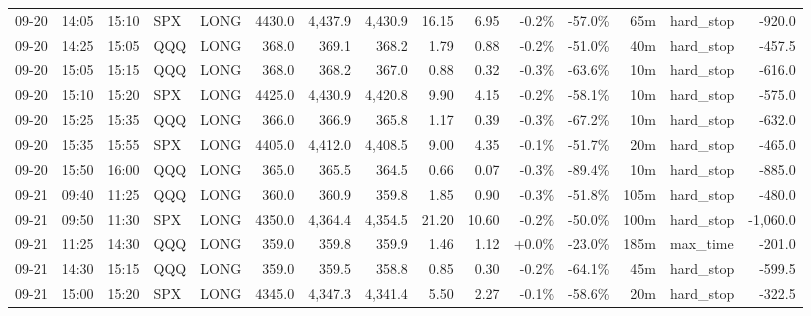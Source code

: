 \documentclass[11pt,a4paper,twoside]{article}
\begin{document}
\begin{landscape}
\begin{center}
\begin{longtable}{>{\color{txtmain}}l l l l l r r r r r r r r >{\color{txtmain}}l r}
09-20 & 14:05 & 15:10 & SPX & LONG & 4430.0 & 4,437.9 & 4,430.9 & 16.15 & 6.95 & \textcolor{lossred}{-0.2\%} & \textcolor{lossred}{-57.0\%} & 65m & hard\_stop & \textcolor{lossred}{-920.0} \\
09-20 & 14:25 & 15:05 & QQQ & LONG & 368.0 & 369.1 & 368.2 & 1.79 & 0.88 & \textcolor{lossred}{-0.2\%} & \textcolor{lossred}{-51.0\%} & 40m & hard\_stop & \textcolor{lossred}{-457.5} \\
09-20 & 15:05 & 15:15 & QQQ & LONG & 368.0 & 368.2 & 367.0 & 0.88 & 0.32 & \textcolor{lossred}{-0.3\%} & \textcolor{lossred}{-63.6\%} & 10m & hard\_stop & \textcolor{lossred}{-616.0} \\
09-20 & 15:10 & 15:20 & SPX & LONG & 4425.0 & 4,430.9 & 4,420.8 & 9.90 & 4.15 & \textcolor{lossred}{-0.2\%} & \textcolor{lossred}{-58.1\%} & 10m & hard\_stop & \textcolor{lossred}{-575.0} \\
09-20 & 15:25 & 15:35 & QQQ & LONG & 366.0 & 366.9 & 365.8 & 1.17 & 0.39 & \textcolor{lossred}{-0.3\%} & \textcolor{lossred}{-67.2\%} & 10m & hard\_stop & \textcolor{lossred}{-632.0} \\
09-20 & 15:35 & 15:55 & SPX & LONG & 4405.0 & 4,412.0 & 4,408.5 & 9.00 & 4.35 & \textcolor{lossred}{-0.1\%} & \textcolor{lossred}{-51.7\%} & 20m & hard\_stop & \textcolor{lossred}{-465.0} \\
09-20 & 15:50 & 16:00 & QQQ & LONG & 365.0 & 365.5 & 364.5 & 0.66 & 0.07 & \textcolor{lossred}{-0.3\%} & \textcolor{lossred}{-89.4\%} & 10m & hard\_stop & \textcolor{lossred}{-885.0} \\
09-21 & 09:40 & 11:25 & QQQ & LONG & 360.0 & 360.9 & 359.8 & 1.85 & 0.90 & \textcolor{lossred}{-0.3\%} & \textcolor{lossred}{-51.8\%} & 105m & hard\_stop & \textcolor{lossred}{-480.0} \\
09-21 & 09:50 & 11:30 & SPX & LONG & 4350.0 & 4,364.4 & 4,354.5 & 21.20 & 10.60 & \textcolor{lossred}{-0.2\%} & \textcolor{lossred}{-50.0\%} & 100m & hard\_stop & \textcolor{lossred}{-1,060.0} \\
09-21 & 11:25 & 14:30 & QQQ & LONG & 359.0 & 359.8 & 359.9 & 1.46 & 1.12 & \textcolor{wingreen}{+0.0\%} & \textcolor{lossred}{-23.0\%} & 185m & max\_time & \textcolor{lossred}{-201.0} \\
09-21 & 14:30 & 15:15 & QQQ & LONG & 359.0 & 359.5 & 358.8 & 0.85 & 0.30 & \textcolor{lossred}{-0.2\%} & \textcolor{lossred}{-64.1\%} & 45m & hard\_stop & \textcolor{lossred}{-599.5} \\
09-21 & 15:00 & 15:20 & SPX & LONG & 4345.0 & 4,347.3 & 4,341.4 & 5.50 & 2.27 & \textcolor{lossred}{-0.1\%} & \textcolor{lossred}{-58.6\%} & 20m & hard\_stop & \textcolor{lossred}{-322.5} \\

\end{longtable}
\end{center}
\end{landscape}
\end{document}
